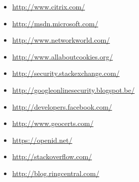 \begin{itemize}
\item \url{http://www.citrix.com/}
\item \url{http://msdn.microsoft.com/}
\item \url{http://www.networkworld.com/}
\item \url{http://www.allaboutcookies.org/}
\item \url{http://security.stackexchange.com/}
\item \url{http://googleonlinesecurity.blogspot.be/}
\item \url{http://developers.facebook.com/}
\item \url{http://www.geocerts.com/}
\item \url{https://openid.net/}
\item \url{http://stackoverflow.com/}
\item \url{http://blog.ringcentral.com/}
\end{itemize}
